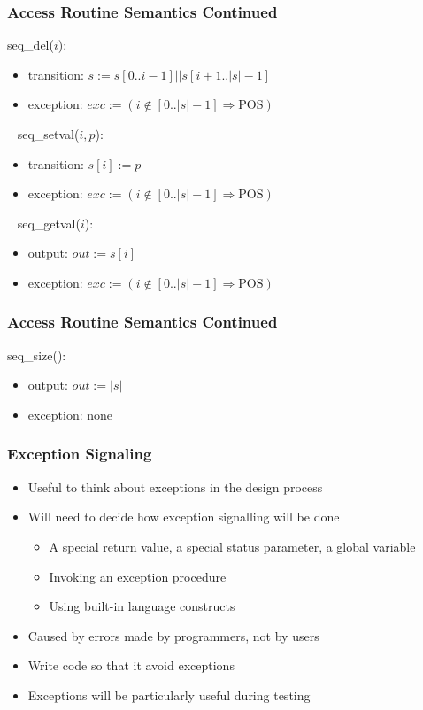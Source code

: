\documentclass[t,12pt,numbers,fleqn]{beamer}
\begin{document}
\begin{frame}
\frametitle{Access Routine Semantics Continued}

\noindent seq\_del($i$):
\begin{itemize}
\item transition: $s := s[0..i-1] || s[i+1..|s|-1]$
\item exception:  $exc := (i \notin [0..|s|-1] \Rightarrow \mathrm{POS})$
\end{itemize}
~\newline
\noindent seq\_setval($i, p$):
\begin{itemize}
\item transition: $s[i] := p$
\item exception: $exc := (i \notin [0..|s|-1] \Rightarrow \mathrm{POS})$
\end{itemize}
~\newline
\noindent seq\_getval($i$):
\begin{itemize}
\item output: $out := s[i]$
\item exception: $exc := (i \notin [0..|s|-1] \Rightarrow \mathrm{POS})$
\end{itemize}

\end{frame}


\begin{frame}
\frametitle{Access Routine Semantics Continued}

\noindent seq\_size():
\begin{itemize}
\item output: $out := | s |$
\item exception: none
\end{itemize}

\end{frame}


\begin{frame}

\frametitle{Exception Signaling}

\begin{itemize}
\item Useful to think about exceptions in the design process
\item Will need to decide how exception signalling will be done
\begin{itemize}
\item A special return value, a special status parameter, a global variable
\item Invoking an exception procedure
\item Using built-in language constructs
\end{itemize}
\item Caused by errors made by programmers, not by users
\item Write code so that it avoid exceptions
\item Exceptions will be particularly useful during testing
\end{itemize}

\end{frame}
\end{document}
